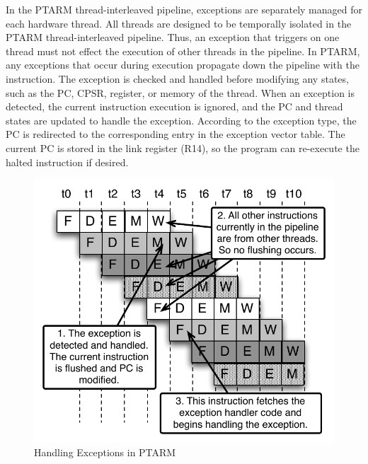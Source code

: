 In the PTARM thread-interleaved pipeline, exceptions are separately managed for each hardware thread.  
All threads are designed to be temporally isolated in the PTARM thread-interleaved pipeline.  
Thus, an exception that triggers on one thread must not effect the execution of other threads in the pipeline.
In PTARM, any exceptions that occur during execution propagate down the pipeline with the instruction.
The exception is checked and handled before modifying any states, such as the PC, CPSR, register, or memory of the thread.  
When an exception is detected, the current instruction execution is ignored, and the PC and thread states are updated to handle the exception.   
According to the exception type, the PC is redirected to the corresponding entry in the exception vector table. 
The current PC is stored in the link register (R14), so the program can re-execute the halted instruction if desired.

\begin{figure}
  \vspace{-30pt}
  \begin{center}
    \includegraphics[scale=.65]{figs/exception_handling_pipeline}
  \end{center}
  \vspace{-3mm}
  \caption{Handling Exceptions in PTARM}
  \label{fig:exception_handling_pipeline}
  \vspace{-10pt}
\end{figure}

